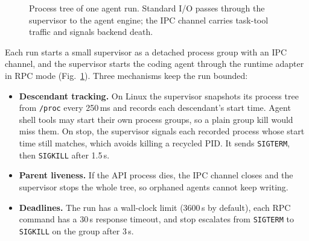 \documentclass[conference]{IEEEtran}
\newcommand{\code}[1]{\texttt{\small #1}}
\begin{document}
\begin{figure}[t]
\centering
{}
\caption{Process tree of one agent run. Standard I/O passes through the
supervisor to the agent engine; the IPC channel carries task-tool traffic and signals
backend death.}
\label{fig:proc}
\end{figure}

Each run starts a small supervisor as a detached process group with an IPC
channel, and the supervisor starts the coding agent through the runtime
adapter in RPC mode
(Fig.~\ref{fig:proc}). Three mechanisms keep the run bounded:
\begin{itemize}
\item \textbf{Descendant tracking.} On Linux the supervisor snapshots its
process tree from \code{/proc} every 250\,ms and records each descendant's
start time. Agent shell tools may start their own process groups, so a plain group
kill would miss them. On stop, the supervisor signals each recorded process
whose start time still matches, which avoids killing a recycled PID. It sends
\code{SIGTERM}, then \code{SIGKILL} after 1.5\,s.
\item \textbf{Parent liveness.} If the API process dies, the IPC channel
closes and the supervisor stops the whole tree, so orphaned agents cannot
keep writing.
\item \textbf{Deadlines.} The run has a wall-clock limit (3600\,s by
default), each RPC command has a 30\,s response timeout, and stop escalates
from \code{SIGTERM} to \code{SIGKILL} on the group after 3\,s.
\end{itemize}
\end{document}
